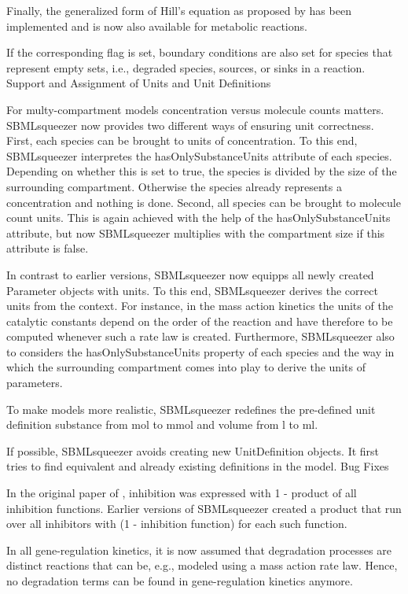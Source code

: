 Finally, the generalized form of Hill's equation as proposed by \citet[in
``Fundamentals of Enzyme Kinetics'', p. 314]{Cornish-Bowden2004} has been
implemented and is now also available for metabolic reactions.

If the corresponding flag is set, boundary conditions are also set for species
that represent empty sets, i.e., degraded species, sources, or sinks in a
reaction.
Support and Assignment of Units and Unit Definitions

For multy-compartment models concentration versus molecule counts matters.
SBMLsqueezer now provides two different ways of ensuring unit correctness.
First, each species can be brought to units of concentration. To this end,
SBMLsqueezer interpretes the hasOnlySubstanceUnits attribute of each species.
Depending on whether this is set to true, the species is divided by the size of
the surrounding compartment. Otherwise the species already represents a
concentration and nothing is done. Second, all species can be brought to
molecule count units. This is again achieved with the help of the
hasOnlySubstanceUnits attribute, but now SBMLsqueezer multiplies with the
compartment size if this attribute is false.

In contrast to earlier versions, SBMLsqueezer now equipps all newly created
Parameter objects with units. To this end, SBMLsqueezer derives the correct
units from the context. For instance, in the mass action kinetics the units of
the catalytic constants depend on the order of the reaction and have therefore
to be computed whenever such a rate law is created. Furthermore, SBMLsqueezer
also to considers the hasOnlySubstanceUnits property of each species and the way
in which the surrounding compartment comes into play to derive the units of
parameters.

To make models more realistic, SBMLsqueezer redefines the pre-defined \SBML unit
definition substance from mol to mmol and volume from l to ml.

If possible, SBMLsqueezer avoids creating new UnitDefinition objects. It first
tries to find equivalent and already existing definitions in the model.
Bug Fixes

In the original paper of \citet{Hinze2007}, inhibition was expressed with 1 -
product of all inhibition functions. Earlier versions of SBMLsqueezer created a
product that run over all inhibitors with (1 - inhibition function) for each
such function.

In all gene-regulation kinetics, it is now assumed that degradation processes
are distinct reactions that can be, e.g., modeled using a mass action rate law.
Hence, no degradation terms can be found in gene-regulation kinetics anymore.

